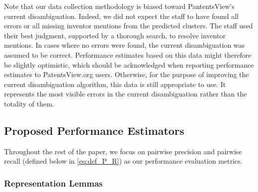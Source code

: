\documentclass[fontsize=11pt]{article}
\newcommand{\ob}[1]{{#1}}
\theoremstyle{definition}
\begin{document}
Note that our data collection methodology is biased toward PantentsView's current disambiguation. {Indeed, we did not expect the staff to have found all errors or all missing inventor mentions from the predicted clusters. The staff used their best judgment, supported by a thorough search, to resolve inventor mentions.} In cases where no errors were found, the current disambiguation was assumed to be correct. Performance estimates based on this data might therefore be slightly optimistic, which should be acknowledged when reporting performance estimates to PatentsView.org users. Otherwise, for the purpose of improving the current disambiguation \ob{algorithm, this data} is still appropriate to use. It represents the most visible errors in the current disambiguation rather than the totality of them.

\subsection{Proposed Performance Estimators}\label{sec:proposed_estimators}

Throughout the rest of the paper, we focus on pairwise precision and pairwise recall (defined below in \eqref{eq:def_P_R}) as our performance evaluation metrics. 


\subsubsection{Representation Lemmas}
\end{document}
